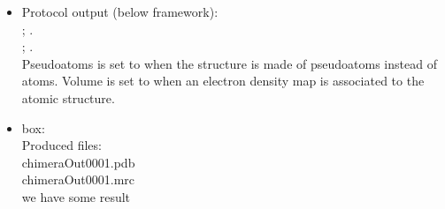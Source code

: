 \begin{itemize}
\begin{itemize}
    \begin{itemize}
     \item Protocol output (below \scipion framework):\\
      ; .\\
      ; .\\Pseudoatoms is set to  when the structure is made of pseudoatoms instead of atoms. Volume is set to  when an electron density map is associated to the atomic structure.
     \item {} box:\\Produced files:\\chimeraOut0001.pdb\\chimeraOut0001.mrc\\we have some result
    \end{itemize}
    
   \end{itemize}
  
 \end{itemize}


